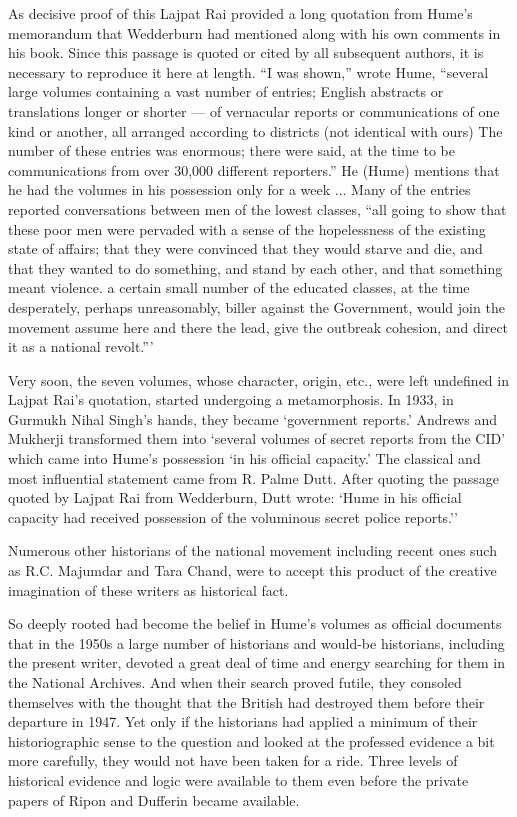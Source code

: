 \begin{multicols}{2}
As decisive proof of this Lajpat Rai provided a long quotation from Hume's memorandum that Wedderburn had mentioned along with his own comments in his book. Since this passage is quoted or cited by all subsequent authors, it is necessary to reproduce it here at length. ``I was shown,'' wrote Hume, ``several large volumes containing a vast number of entries; English abstracts or translations longer or shorter --- of vernacular reports or communications of one kind or another, all arranged according to districts (not identical with ours) The number of these entries was enormous; there were said, at the time to be communications from over 30,000 different reporters.'' He (Hume) mentions that he had the volumes in his possession only for a week ... Many of the entries reported conversations between men of the lowest classes, ``all going to show that these poor men were pervaded with a sense of the hopelessness of the existing state of affairs; that they were convinced that they would starve and die, and that they wanted to do something, and stand by each other, and that something meant violence. a certain small number of the educated classes, at the time desperately, perhaps unreasonably, biller against the Government, would join the movement assume here and there the lead, give the outbreak cohesion, and direct it as a national revolt.'''

Very soon, the seven volumes, whose character, origin, etc., were left undefined in Lajpat Rai's quotation, started undergoing a metamorphosis. In 1933, in Gurmukh Nihal Singh's hands, they became `government reports.' Andrews and Mukherji transformed them into `several volumes of secret reports from the CID' which came into Hume's possession `in his official capacity.' The classical and most influential statement came from R. Palme Dutt. After quoting the passage quoted by Lajpat Rai from Wedderburn, Dutt wrote: `Hume in his official capacity had received possession of the voluminous secret police reports.''

Numerous other historians of the national movement including recent ones such as R.C. Majumdar and Tara Chand, were to accept this product of the creative imagination of these writers as historical fact.

So deeply rooted had become the belief in Hume's volumes as official documents that in the 1950s a large number of historians and would-be historians, including the present writer, devoted a great deal of time and energy searching for them in the National Archives. And when their search proved futile, they consoled themselves with the thought that the British had destroyed them before their departure in 1947. Yet only if the historians had applied a minimum of their historiographic sense to the question and looked at the professed evidence a bit more carefully, they would not have been taken for a ride. Three levels of historical evidence and logic were available to them even before the private papers of Ripon and Dufferin became available.


\end{multicols}

